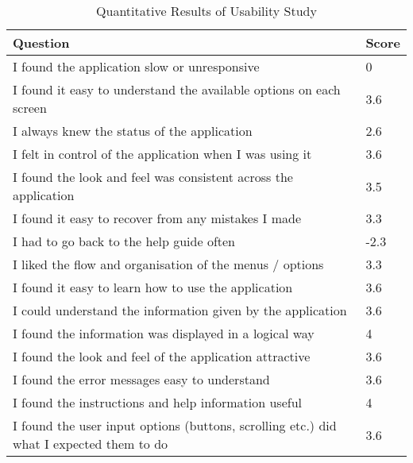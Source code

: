 {	\begin{table}[ht]
		\begin{center}				
			\begin{tabularx}{\textwidth}{| X | l |}
				\hline
				\textbf{Question} & \textbf{Score}\\
				\hline
				I found the application slow or unresponsive & 0\\
				\hline
				I found it easy to understand the available options on each screen & 3.6\\
				\hline
				I always knew the status of the application & 2.6\\
				\hline
				I felt in control of the application when I was using it & 3.6\\
				\hline
				I found the look and feel was consistent across the application & 3.5\\
				\hline
				I found it easy to recover from any mistakes I made & 3.3\\
				\hline
				I had to go back to the help guide often & -2.3\\
				\hline
				I liked the flow and organisation of the menus / options & 3.3\\
				\hline
				I found it easy to learn how to use the application & 3.6\\
				\hline
				I could understand the information given by the application & 3.6\\
				\hline
				I found the information was displayed in a logical way & 4\\
				\hline
				I found the look and feel of the application attractive & 3.6\\
				\hline
				I found the error messages easy to understand & 3.6\\
				\hline
				I found the instructions and help information useful & 4\\
				\hline
				I found the user input options (buttons, scrolling etc.) did what I expected them to do & 3.6\\
				\hline
			\end{tabularx}
			\caption{Quantitative Results of Usability Study}
			\label{tab:UsabilityScores}
		\end{center}
	\end{table}
	
	
			
	\label{sec:Usability}
}

